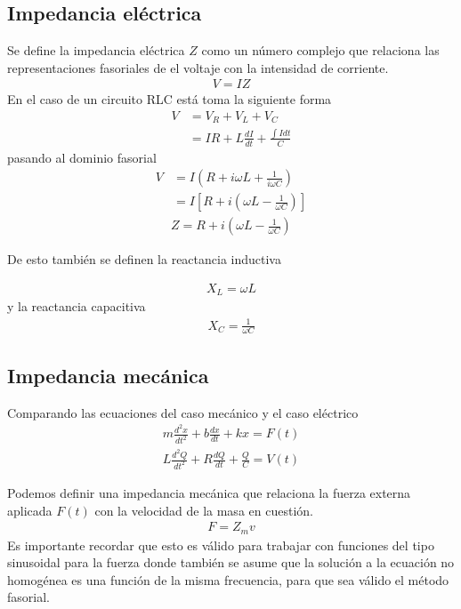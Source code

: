 \documentclass[12pt]{article}
\begin{document}
\subsection{Impedancia eléctrica}
Se define la impedancia eléctrica \(Z\) como un número complejo que relaciona las representaciones fasoriales de el voltaje con la intensidad de corriente.
\begin{align}
    V=I Z
\end{align}
En el caso de un circuito RLC está toma la siguiente forma
\begin{align*}
    V &= V_R + V_L + V_C \\
    &= IR + L \frac{dI}{dt} + \frac{\int I dt}{C}
\end{align*}
pasando al dominio fasorial
\begin{align*}
    V &= I \left( R + i \omega L + \frac{1}{i \omega C}\right) \\
    &= I \left[ R + i\left(\omega L - \frac{1}{\omega C}\right) \right] 
\end{align*}
\begin{align*}
    Z =  R + i\left(\omega L - \frac{1}{\omega C}\right) \tag{impedancia en RLC}
\end{align*}

De esto también se definen la reactancia inductiva

\begin{align}
    X_L = \omega L \label{eq: reactancia inductiva}
\end{align}
y la reactancia capacitiva
\begin{align}
    X_C = \frac{1}{\omega C} \label{eq: reactancia capacitiva}
\end{align}

\subsection{Impedancia mecánica }

Comparando las ecuaciones del caso mecánico y el caso eléctrico
\begin{align*}
    m\frac{d^{2}x}{dt^{2}} + b\frac{dx}{dt} + k x = F(t)\\
    L \frac{d^{2} Q}{dt^{2}} + R \frac{dQ}{dt} + \frac{Q}{C} = V(t)
\end{align*}

Podemos definir una impedancia mecánica que relaciona la fuerza externa aplicada \(F(t)\) con la velocidad de la masa en cuestión.
\begin{align}
    F = Z_m v \label{eq: impedancia mecánica}
\end{align}
Es importante recordar que esto es válido para trabajar con funciones del tipo sinusoidal para la fuerza donde también se asume que la solución a la ecuación no homogénea es una función de la misma frecuencia, para que sea válido el método fasorial.
\end{document}
